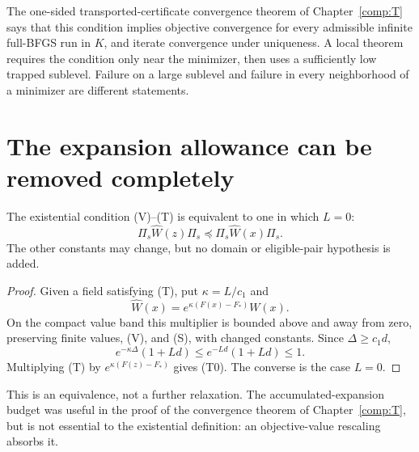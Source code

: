 The one-sided transported-certificate convergence theorem of Chapter~\ref{comp:T} says that this condition implies objective convergence for every admissible infinite full-BFGS run in $K$, and iterate convergence under uniqueness. A local theorem requires the condition only near the minimizer, then uses a sufficiently low trapped sublevel. Failure on a large sublevel and failure in every neighborhood of a minimizer are different statements.


\setcounter{section}{1}
\setcounter{theorem}{0}
\setcounter{equation}{1}


\section{The expansion allowance can be removed completely}

\begin{proposition}
The existential condition (V)--(T) is equivalent to one in which $L=0$:
\begin{equation}
 \Pi_s\widehat W(z)\Pi_s\preceq\Pi_s\widehat W(x)\Pi_s. \tag{5.T0}
\end{equation}
The other constants may change, but no domain or eligible-pair hypothesis is added.
\end{proposition}
\begin{proof}
Given a field satisfying (T), put $\kappa=L/c_1$ and
\[
 \widehat W(x)=e^{\kappa(F(x)-F_*)}W(x).
\]
On the compact value band this multiplier is bounded above and away from zero, preserving finite values, (V), and (S), with changed constants. Since $\Delta\ge c_1d$,
\[
 e^{-\kappa\Delta}(1+Ld)\le e^{-Ld}(1+Ld)\le1.
\]
Multiplying (T) by $e^{\kappa(F(z)-F_*)}$ gives (T0). The converse is the case $L=0$.
\end{proof}
This is an equivalence, not a further relaxation. The accumulated-expansion budget was useful in the proof of the convergence theorem of Chapter~\ref{comp:T}, but is not essential to the existential definition: an objective-value rescaling absorbs it.



